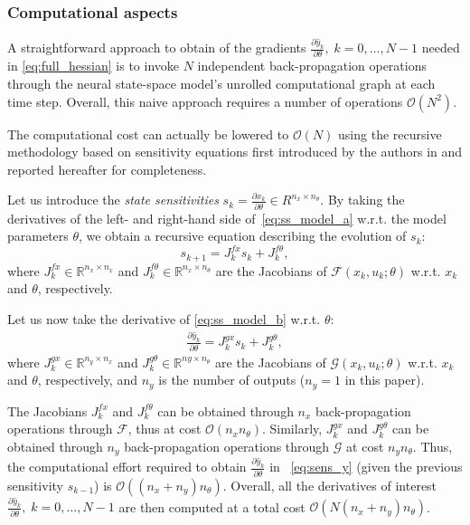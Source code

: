 \documentclass{ifacconf}
\newcommand{\R}{\mathbb{R}}
\newcommand{\ny}{{n_y}}
\newcommand{\nx}{{n_x}}
\newcommand{\nsamp}{N}
\newcommand{\npar}{{n_\theta}}
\newcommand{\F}{\mathcal{F}} %
\newcommand{\G}{\mathcal{G}} %
\newcommand{\mean}[1]{\hat{#1}}
\begin{document}
\subsubsection{Computational aspects}A straightforward approach to obtain of the gradients $\frac{\partial \mean{y}_k}{\partial \theta},\; k\!=\!0,\dots,\nsamp\!-\!1$ 
needed in \eqref{eq:full_hessian} is to invoke $\nsamp$ independent back-propagation operations through the neural state-space model's unrolled computational graph at each time step. Overall, this naive approach requires a number of operations $\mathcal{O}(N^2)$. 

The computational cost can actually be lowered to $\mathcal{O}(N)$ using the recursive methodology based on sensitivity equations first introduced by the authors in \cite{forgione2022adaptation} and reported hereafter for completeness.

Let us introduce the \emph{state sensitivities} $s_{k} = \frac{\partial x_{k}}{\partial \theta}\in R^{\nx \times \npar}$.
By taking the derivatives of the left- and right-hand side of~\eqref{eq:ss_model_a} w.r.t. the model parameters $\theta$, we obtain a recursive equation describing the evolution of $s_k$:
\label{eq:sens}
\begin{equation}
    \label{eq:sens_x}
    s_{k+1} = J^{fx}_k s_k + J^{f\theta}_k,
\end{equation}
where $J^{fx}_k \in \R^{\nx \times \nx}$ and $J^{f\theta}_k \in \R^{\nx \times \npar}$ are the Jacobians of  $\mathcal{F}(x_k, u_k; \theta)$ w.r.t. $x_k$ and $\theta$, respectively.

Let us now take the derivative of \eqref{eq:ss_model_b} w.r.t. $\theta$:
\begin{align}
\label{eq:sens_y}
    \frac{\partial \mean{y}_k}{\partial \theta} = J^{gx}_{k} s_k + J^{g\theta}_{k},
\end{align}
where $J^{gx}_{k} \in \R^{\ny \times \nx}$ and $J^{g\theta}_{k} \in \R^{ny \times \npar}$ are the Jacobians of  $\mathcal{G}(x_{k}, u_{k}; \theta)$ w.r.t. $x_{k}$ and $\theta$, respectively,  and $n_y$ is the number of 
outputs ($n_y=1$ in this paper).

The Jacobians $J^{fx}_{k}$ and $J^{f\theta}_{k}$ can be obtained through $\nx$ back-propagation operations through $\F$, thus at cost $\mathcal{O}(\nx \npar)$. Similarly, $J^{gx}_{k}$ and $J^{g\theta}_{k}$ can be obtained through $n_y$ back-propagation operations through $\G$ at cost $\ny \npar$.
Thus, the computational effort required to obtain $\frac{\partial \mean{y}_k}{\partial \theta}$ in ~\eqref{eq:sens_y} (given the previous sensitivity $s_{k-1}$) is $\mathcal{O}((\nx + n_y)\npar)$. Overall, all the derivatives of interest $\frac{\partial \mean{y}_k}{\partial \theta},\; k\!=\!0,\dots,\nsamp\!-\!1$ are then computed at a total cost $\mathcal{O}(\nsamp (\nx + n_y)\npar)$.\\
\end{document}
